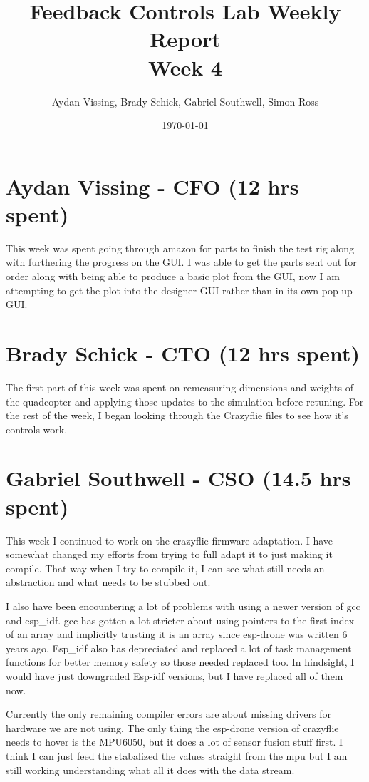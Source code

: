 \documentclass[12pt, titlepage]{article}
\title{Feedback Controls Lab Weekly Report \\ \normalsize{Week 4}}
\author{Aydan Vissing, Brady Schick, Gabriel Southwell, Simon Ross}
\date{\today}
\begin{document}
\maketitle

\section*{Aydan Vissing - CFO (12 hrs spent)}

This week was spent going through amazon for parts to finish the test rig along with furthering the progress on the GUI. I was able to get the parts sent out for order along with being able to produce a basic plot from the GUI, now I am attempting to get the plot into the designer GUI rather than in its own pop up GUI. 

\section*{Brady Schick - CTO (12 hrs spent)}

The first part of this week was spent on remeasuring dimensions and weights of the quadcopter and applying those updates to the simulation before retuning. For the rest of the week, I began looking through the Crazyflie files to see how it's controls work.

\section*{Gabriel Southwell - CSO (14.5 hrs spent)}

This week I continued to work on the crazyflie firmware adaptation. I have somewhat changed my efforts from trying to full adapt it to just making it compile. That way when I try to compile it, I can see what still needs an abstraction and what needs to be stubbed out. 

I also have been encountering a lot of problems with using a newer version of gcc and esp\_idf. gcc has gotten a lot stricter about using pointers to the first index of an array and implicitly trusting it is an array since esp-drone was written 6 years ago. Esp\_idf also has depreciated and replaced a lot of task management functions for better memory safety so those needed replaced too. In hindsight, I would have just downgraded Esp-idf versions, but I have replaced all of them now. 

Currently the only remaining compiler errors are about missing drivers for hardware we are not using. The only thing the esp-drone version of crazyflie needs to hover is the MPU6050, but it does a lot of sensor fusion stuff first. I think I can just feed the stabalized the values straight from the mpu but I am still working understanding what all it does with the data stream.
\end{document}
